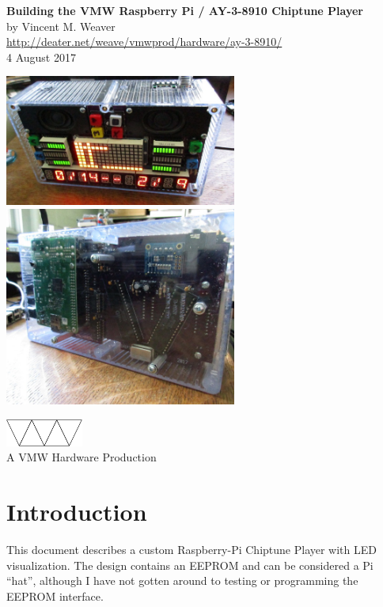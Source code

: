 \documentclass[11pt]{article}
\begin{document}
\begin{center}
{\Large \bf Building the VMW Raspberry Pi / AY-3-8910 Chiptune Player}\\[2ex]
by Vincent M. Weaver\\[3ex]
\url{http://deater.net/weave/vmwprod/hardware/ay-3-8910/}\\[3ex]
4 August 2017
\end{center}

\begin{center}
\includegraphics[width=3in]{figs/0377_front_view.jpg}
\includegraphics[width=3in]{figs/0378_back_view.jpg}
\end{center}
\vspace{3ex}
\begin{center}
\includegraphics[width=1in]{figs/vmw}\\
A VMW Hardware Production
\end{center}

\pagebreak

\section{Introduction}

This document describes a custom Raspberry-Pi Chiptune Player with
LED visualization.
The design contains an EEPROM and can be considered a Pi ``hat'', although
I have not gotten around to testing or programming the EEPROM interface.
\end{document}
